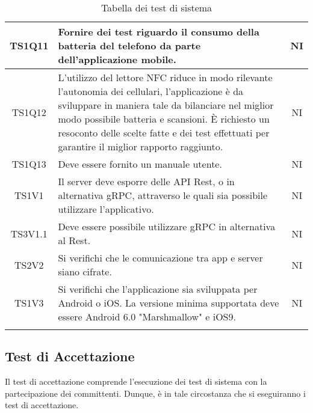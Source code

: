 \begin{center}
\begin{longtable}{|c|p{10cm}|c|}
			\hline
			TS1Q11 & Fornire dei test riguardo il consumo della batteria del telefono da parte dell'applicazione mobile. & NI \\	
			\hline
			TS1Q12 & L’utilizzo del lettore NFC riduce in modo rilevante l’autonomia dei cellulari, l’applicazione è da sviluppare in maniera tale da bilanciare nel miglior modo possibile batteria e scansioni. È richiesto un resoconto delle scelte fatte e dei test effettuati per garantire il miglior rapporto raggiunto. & NI \\	
			\hline
			TS1Q13 & Deve essere fornito un manuale utente. & NI \\	
			\hline
			TS1V1 & Il server deve esporre delle API Rest, o in alternativa gRPC, attraverso le quali sia possibile utilizzare l'applicativo. & NI \\	
			\hline
			TS3V1.1 & Deve essere possibile utilizzare gRPC in alternativa al Rest. & NI \\	
			\hline
			TS2V2 & Si verifichi che le comunicazione tra app e server siano cifrate. & NI \\	
			\hline
			TS1V3 & Si verifichi che l'applicazione sia sviluppata per Android o iOS. La versione minima supportata deve essere  Android 6.0 "Marshmallow" e iOS9. & NI \\	
			\hline
			\hiderowcolors
			\caption{Tabella dei test di sistema}		
		\end{longtable}	
	\end{center}

	\subsection{Test di Accettazione}
	Il test di accettazione comprende l'esecuzione dei test di sistema con la partecipazione dei committenti. Dunque, è in tale circostanza che si eseguiranno i test di accettazione. 
